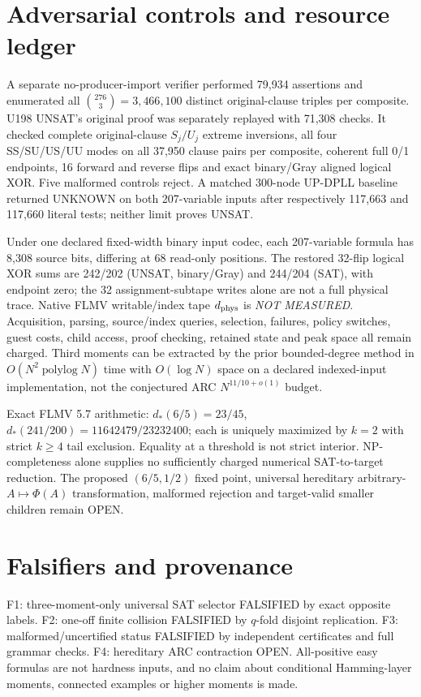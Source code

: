 \documentclass[10pt]{article}
\begin{document}
\section*{Adversarial controls and resource ledger}
A separate no-producer-import verifier performed 79,934 assertions and enumerated all $\binom{276}{3}=3{,}466{,}100$ distinct original-clause triples per composite. U198 UNSAT's original proof was separately replayed with 71,308 checks. It checked complete original-clause $S_j/U_j$ extreme inversions, all four SS/SU/US/UU modes on all 37,950 clause pairs per composite, coherent full 0/1 endpoints, 16 forward and reverse flips and exact binary/Gray aligned logical XOR. Five malformed controls reject. A matched 300-node UP-DPLL baseline returned UNKNOWN on both 207-variable inputs after respectively 117,663 and 117,660 literal tests; neither limit proves UNSAT.

Under one declared fixed-width binary input codec, each 207-variable formula has 8,308 source bits, differing at 68 read-only positions. The restored 32-flip logical XOR sums are 242/202 (UNSAT, binary/Gray) and 244/204 (SAT), with endpoint zero; the 32 assignment-subtape writes alone are not a full physical trace. Native FLMV writable/index tape $d_{\rm phys}$ is \emph{NOT MEASURED}. Acquisition, parsing, source/index queries, selection, failures, policy switches, guest costs, child access, proof checking, retained state and peak space all remain charged. Third moments can be extracted by the prior bounded-degree method in $O(N^2\operatorname{polylog}N)$ time with $O(\log N)$ space on a declared indexed-input implementation, not the conjectured ARC $N^{11/10+o(1)}$ budget.

Exact FLMV 5.7 arithmetic: $d_*(6/5)=23/45$, $d_*(241/200)=11642479/23232400$; each is uniquely maximized by $k=2$ with strict $k\ge4$ tail exclusion. Equality at a threshold is not strict interior. NP-completeness alone supplies no sufficiently charged numerical SAT-to-target reduction. The proposed $(6/5,1/2)$ fixed point, universal hereditary arbitrary-$A\mapsto\Phi(A)$ transformation, malformed rejection and target-valid smaller children remain OPEN.

\section*{Falsifiers and provenance}
F1: three-moment-only universal SAT selector FALSIFIED by exact opposite labels. F2: one-off finite collision FALSIFIED by $q$-fold disjoint replication. F3: malformed/uncertified status FALSIFIED by independent certificates and full grammar checks. F4: hereditary ARC contraction OPEN. All-positive easy formulas are not hardness inputs, and no claim about conditional Hamming-layer moments, connected examples or higher moments is made.
\end{document}
